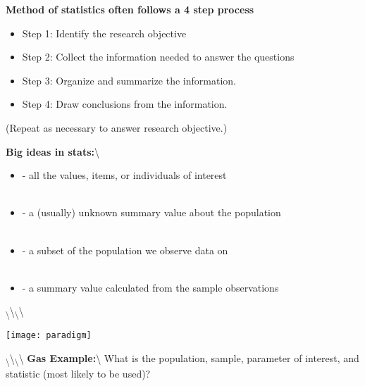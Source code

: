 \documentclass[]{book}
\begin{document}
\textbf{Method of statistics often follows a 4 step process}

\begin{itemize}
\item   Step 1: Identify the research objective
\item   Step 2: Collect the information needed to answer the questions
\item Step 3: Organize and summarize the information.
\item Step 4: Draw conclusions from the information.
\end{itemize}

(Repeat as necessary to answer research objective.)

\newpage

\textbf{Big ideas in stats:}\textbackslash{}

\begin{itemize}
\item \underbar{~~~~~~~~~~~~~~~~~~~~~~~~~~~~~~} - all the values, items, or individuals of interest\\~\\

\item \underbar{~~~~~~~~~~~~~~~~~~~~~~~~~~~~~~}  - a (usually) unknown summary value about the population\\~\\

\item \underbar{~~~~~~~~~~~~~~~~~~~~~~~~~~~~~~} - a subset of the population we observe data on\\~\\

\item \underbar{~~~~~~~~~~~~~~~~~~~~~~~~~~~~~~} - a summary value calculated from the sample observations
\end{itemize}

\textsubscript{\textbackslash{}}\textbackslash{}\textsubscript{\textbackslash{}}\textbackslash{}

\begin{center}
\texttt{[image: paradigm]}
\end{center}

\textsubscript{\textbackslash{}}\textbackslash{}\textsubscript{\textbackslash{}}\textbackslash{}
\textbf{Gas Example:}\textbackslash{} What is the population, sample,
parameter of interest, and statistic (most likely to be used)?

\newpage
\end{document}
